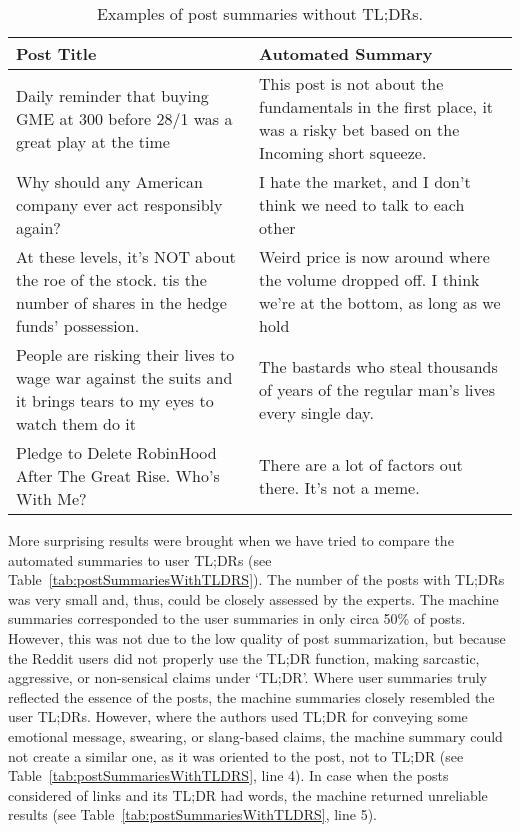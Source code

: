 \begin{table}[ht]%
	\caption{Examples of post summaries without TL;DRs.}%
	\label{tab:postSummaries}%
	\renewcommand{\arraystretch}{1.6}%
	\def\tabularxcolumn#1{m{#1}}
	\begin{tabularx}{\textwidth}{@{}>{\centering}m{8.0cm}  >{\centering\arraybackslash}m{8.0cm}@{}}%
		\toprule     %
		Post Title & Automated Summary\\
		\midrule %
		Daily reminder that buying GME at 300 before 28/1 was a great play at the time & This post is not about the fundamentals in the first place, it was a risky bet based on the Incoming short squeeze.\\
		Why should any American company ever act responsibly again? & I hate the market, and I don’t think we need to talk to each other\\
		At these levels, it’s NOT about the roe of the stock. tis the number of shares in the hedge funds’ possession. & Weird price is now around where the volume dropped off. I think we’re at the bottom, as long as we hold\\
		People are risking their lives to wage war against the suits and it brings tears to my eyes to watch them do it & The bastards who steal thousands of years of the regular man’s lives every single day.\\
		Pledge to Delete RobinHood After The Great Rise. Who’s With Me? & There are a lot of factors out there. It’s not a meme.\\
		\bottomrule %
	\end{tabularx}%
\end{table}

More surprising results were brought when we have tried to compare the automated summaries to user TL;DRs (see Table~\cref{tab:postSummariesWithTLDRS}). The number of the posts with TL;DRs was very small and, thus, could be closely assessed by the experts. The machine summaries corresponded to the user summaries in only circa 50\% of posts. However, this was not due to the low quality of post summarization, but because the Reddit users did not properly use the TL;DR function, making sarcastic, aggressive, or non-sensical claims under ‘TL;DR’. Where user summaries truly reflected the essence of the posts, the machine summaries closely resembled the user TL;DRs. However, where the authors used TL;DR for conveying some emotional message, swearing, or slang-based claims, the machine summary could not create a similar one, as it was oriented to the post, not to TL;DR (see Table~\cref{tab:postSummariesWithTLDRS}, line 4). In case when the posts considered of links and its TL;DR had words, the machine returned unreliable results (see Table~\cref{tab:postSummariesWithTLDRS}, line 5).

